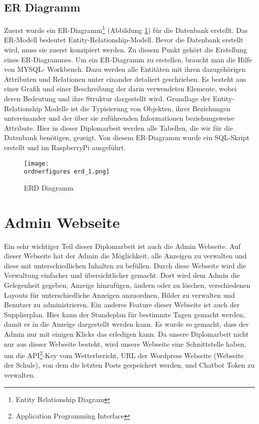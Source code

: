 \subsection{ER Diagramm}
Zuerst wurde ein ER-Diagramm\footnote{Entity Relationship Diagram} (Abbildung \ref{fi:erd}) für die Datenbank erstellt. Das ER-Modell bedeutet Entity-Relationship-Modell. Bevor die Datenbank erstellt wird, muss sie zuerst konzipiert werden. Zu diesem Punkt gehört die Erstellung eines ER-Diagrammes. Um ein ER-Diagramm zu erstellen, braucht man die Hilfe von MYSQL- Workbench. Dazu werden alle Entitäten mit ihren dazugehörigen Attributen und Relationen unter einander detaliert geschrieben. Es besteht aus einer Grafik und einer Beschreibung der darin verwendeten Elemente, wobei deren Bedeutung und ihre Struktur dargestellt wird. Grundlage der Entity-Relationship Modelle ist die Typisierung von Objekten, ihrer Beziehungen untereinander und der über sie zuführenden Informationen beziehungsweise Attribute. Hier in dieser Diplomarbeit werden alle Tabellen, die wir für die Datenbank benötigen, gezeigt. Von diesem ER-Diagramm wurde ein SQL-Skript erstellt und im RaspberryPi ausgeführt.

\begin{figure}[H]
	\centering
	\texttt{[image: \\ordnerfigures erd\_1.png]}
	\caption{ERD Diagramm}
	\label{fi:erd}
\end{figure}

\section{Admin Webseite}
Ein sehr wichtiger Teil dieser Diplomarbeit ist auch die Admin Webseite. Auf dieser Webseite hat der Admin die M\"{o}glichkeit, alle Anzeigen zu verwalten und diese mit unterschiedlichen Inhalten zu bef\"{u}llen. Durch diese Webseite wird die Verwaltung einfacher und \"{u}bersichtlicher gemacht. Dort wird dem Admin die Gelegenheit gegeben, Anzeige hinzuf\"{u}gen, \"{a}ndern oder zu l\"{o}schen, verschiedenen Layouts f\"{u}r unterschiedliche Anzeigen anzuordnen, Bilder zu verwalten und Benutzer zu administrieren. Ein anderes Feature dieser Webseite ist auch der Supplierplan. Hier kann der Stundeplan f\"{u}r bestimmte Tagen gemacht werden, damit er in die Anzeige dargestellt werden kann. Es wurde so gemacht, dass der Admin nur mit einigen Klicks das erledigen kann. Da unsere Diplomarbeit nicht nur aus dieser Webseite besteht, wird unsere Webseite eine Schnittstelle haben, um die API\footnote{Application Programming Interface}-Key vom Wetterbericht, URL der Wordpress Webseite (Webseite der Schule), von dem die letzten Posts gespeichert werden, und Chatbot Token zu verwalten.


